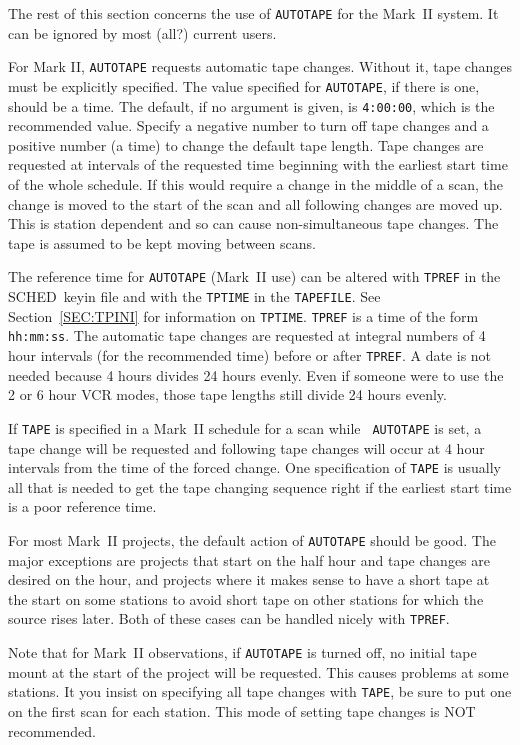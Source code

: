 \documentclass{report}
\newcommand{\schedb}{{\sc SCHED~}}
\begin{document}
The rest of this section concerns the use of {\tt AUTOTAPE} for
the Mark~II system.  It can be ignored by most (all?) current
users.

For Mark II, {\tt AUTOTAPE} requests automatic tape changes.  Without
it, tape changes must be explicitly specified.  The value specified
for {\tt AUTOTAPE}, if there is one, should be a time.  The default,
if no argument is given, is {\tt 4:00:00}, which is the recommended
value.  Specify a negative number to turn off tape changes and a
positive number (a time) to change the default tape length.  Tape
changes are requested at intervals of the requested time beginning
with the earliest start time of the whole schedule. If this would
require a change in the middle of a scan, the change is moved to the
start of the scan and all following changes are moved up. This is
station dependent and so can cause non-simultaneous tape changes. The
tape is assumed to be kept moving between scans.

The reference time for {\tt AUTOTAPE} (Mark~II use) can be altered
with {\tt TPREF} in the \schedb keyin file and with the {\tt TPTIME}
in the {\tt TAPEFILE}. See Section~\ref{SEC:TPINI} for information on
{\tt TPTIME}. {\tt TPREF} is a time of the form {\tt hh:mm:ss}. The
automatic tape changes are requested at integral numbers of 4 hour
intervals (for the recommended time) before or after {\tt TPREF}. A
date is not needed because 4 hours divides 24 hours evenly. Even if
someone were to use the 2 or 6 hour VCR modes, those tape lengths
still divide 24 hours evenly.

If {\tt TAPE} is specified in a Mark~II schedule for a scan while {\tt
AUTOTAPE} is set, a tape change will be requested and following tape
changes will occur at 4 hour intervals from the time of the forced
change. One specification of {\tt TAPE} is usually all that is needed
to get the tape changing sequence right if the earliest start time is
a poor reference time.

For most Mark~II projects, the default action of {\tt AUTOTAPE} should
be good. The major exceptions are projects that start on the half hour
and tape changes are desired on the hour, and projects where it makes
sense to have a short tape at the start on some stations to avoid
short tape on other stations for which the source rises later. Both of
these cases can be handled nicely with {\tt TPREF}.

Note that for Mark~II observations, if {\tt AUTOTAPE} is turned off,
no initial tape mount at the start of the project will be requested.
This causes problems at some stations. It you insist on specifying all
tape changes with {\tt TAPE}, be sure to put one on the first scan for
each station. This mode of setting tape changes is NOT recommended.
\end{document}

